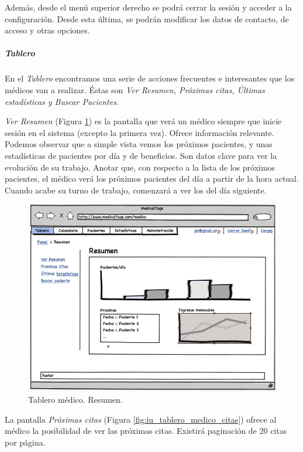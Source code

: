 		Además, desde el menú superior derecho se podrá cerrar la sesión y acceder a la configuración. Desde esta última, se podrán modificar los datos de contacto, de acceso y otras opciones.
		
		\subparagraph{Tablero} %
		\label{par:medico_tablero}
		
			En el \textit{Tablero} encontramos una serie de acciones frecuentes e interesantes que los médicos van a realizar. Éstas son \textit{Ver Resumen, Próximas citas, Últimas estadísticas y Buscar Pacientes}.
			
			\textit{Ver Resumen} (Figura \ref{fig:iu_tablero_medico_resumen}) es la pantalla que verá un médico siempre que inicie sesión en el sistema (excepto la primera vez). Ofrece información relevante. Podemos observar que a simple vista vemos los próximos pacientes, y unas estadísticas de pacientes por día y de beneficios. Son datos clave para ver la evolución de su trabajo. Anotar que, con respecto a la lista de los próximos pacientes, el médico verá los próximos pacientes del día a partir de la hora actual. Cuando acabe su turno de trabajo, comenzará a ver los del día siguiente.
		
			\begin{figure}[H]
			  \centering
			    \includegraphics[width=12cm]{img/png/interfaz/8_Dashboard_Medico_Tablero.png}
			  \caption{Tablero médico. Resumen.}
			  \label{fig:iu_tablero_medico_resumen}
			\end{figure}
			
			La pantalla \textit{Próximas citas} (Figura \ref{fig:iu_tablero_medico_citas}) ofrece al médico la posibilidad de ver las próximas citas. Existirá paginación de 20 citas por página.	
			
